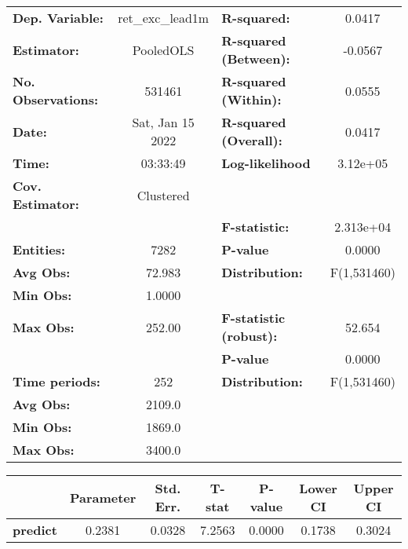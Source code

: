 \begin{center}
\begin{tabular}{lclc}
\toprule
\textbf{Dep. Variable:}    &  ret\_exc\_lead1m  & \textbf{  R-squared:         }   &      0.0417      \\
\textbf{Estimator:}        &     PooledOLS      & \textbf{  R-squared (Between):}  &     -0.0567      \\
\textbf{No. Observations:} &       531461       & \textbf{  R-squared (Within):}   &      0.0555      \\
\textbf{Date:}             &  Sat, Jan 15 2022  & \textbf{  R-squared (Overall):}  &      0.0417      \\
\textbf{Time:}             &      03:33:49      & \textbf{  Log-likelihood     }   &     3.12e+05     \\
\textbf{Cov. Estimator:}   &     Clustered      & \textbf{                     }   &                  \\
\textbf{}                  &                    & \textbf{  F-statistic:       }   &    2.313e+04     \\
\textbf{Entities:}         &        7282        & \textbf{  P-value            }   &      0.0000      \\
\textbf{Avg Obs:}          &       72.983       & \textbf{  Distribution:      }   &   F(1,531460)    \\
\textbf{Min Obs:}          &       1.0000       & \textbf{                     }   &                  \\
\textbf{Max Obs:}          &       252.00       & \textbf{  F-statistic (robust):} &      52.654      \\
\textbf{}                  &                    & \textbf{  P-value            }   &      0.0000      \\
\textbf{Time periods:}     &        252         & \textbf{  Distribution:      }   &   F(1,531460)    \\
\textbf{Avg Obs:}          &       2109.0       & \textbf{                     }   &                  \\
\textbf{Min Obs:}          &       1869.0       & \textbf{                     }   &                  \\
\textbf{Max Obs:}          &       3400.0       & \textbf{                     }   &                  \\
\bottomrule
\end{tabular}
\begin{tabular}{lcccccc}
                 & \textbf{Parameter} & \textbf{Std. Err.} & \textbf{T-stat} & \textbf{P-value} & \textbf{Lower CI} & \textbf{Upper CI}  \\
\midrule
\textbf{predict} &       0.2381       &       0.0328       &      7.2563     &      0.0000      &       0.1738      &       0.3024       \\
\bottomrule
\end{tabular}
\end{center}
